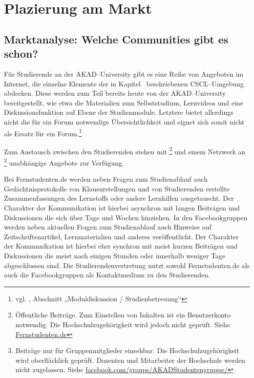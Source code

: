 \section{Plazierung am Markt} %
\label{sec:plazierung_am_markt}

\subsection{Marktanalyse: Welche Communities gibt es schon?} %
\label{sub:marktanalyse_welche_communities_gibt_es_schon}
Für Studierende an der AKAD–University gibt es eine Reihe von Angeboten im Internet, die einzelne Elemente der in Kapitel~ beschriebenen \ac{CSCL}–Umgebung abdecken. Diese werden zum Teil bereits heute von der AKAD–University bereitgestellt, wie etwa die Materialien zum Selbststudium, Lernvideos und eine Diskussionsfunktion auf Ebene der Studienmodule. Letztere bietet allerdings nicht die für ein Forum notwendige Übersichtlichkeit und eignet sich somit nicht als Ersatz für ein Forum.\footnote{vgl. \cite{defstud}, Abschnitt „Moduldiskussion / Studienbetreuung“}

Zum Austausch zwischen den Studierenden stehen mit \footnote{Öffentliche Beiträge. Zum Einstellen von Inhalten ist ein Benutzerkonto notwendig. Die Hochschulzugehörigkeit wird jedoch nicht geprüft. Siehe \url{Fernstudenten.de}} und einem Netzwerk an \footnote{Beiträge nur für Gruppenmitglieder einsehbar. Die Hochschulzugehörigkeit wird oberflächlich geprüft. Dozenten und Mitarbeiter der Hochschule werden nicht zugelassen. Siehe \url{facebook.com/groups/AKADStudentengruppe/}} unabhängige Angebote zur Verfügung.

Bei Fernstudenten.de werden neben Fragen zum Studienablauf auch Gedächtnisprotokolle von Klausurstellungen und von Studierenden erstellte Zusammenfassungen des Lernstoffs oder andere Lernhilfen ausgetauscht. Der Charakter der Kommunikation ist hierbei asynchron mit langen Beiträgen und Diskussionen die sich über Tage und Wochen hinziehen. In den Facebookgruppen werden neben aktuellen Fragen zum Studienablauf auch Hinweise auf Zeitschriftenartikel, Lernmaterialien und anderes veröffentlicht. Der Charakter der Kommunikation ist hierbei eher synchron mit meist kurzen Beiträgen und Diskussionen die meist nach einigen Stunden oder innerhalb weniger Tage abgeschlossen sind.
Die Studierendenvertretung nutzt sowohl Fernstudenten.de als auch die Facebookgruppen als Kontaktmedium zu den Studierenden.

